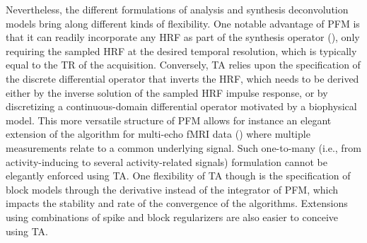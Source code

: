 Nevertheless, the different formulations of analysis and synthesis deconvolution models bring along different kinds of flexibility. One notable advantage of PFM is that it can readily incorporate any HRF as part of the synthesis operator (\citealt{Elad2007Analysisversussynthesis}), only requiring the sampled HRF at the desired temporal resolution, which is typically equal to the TR of the acquisition. Conversely, TA relies upon the specification of the discrete differential operator that inverts the HRF, which needs to be derived either by the inverse solution of the sampled HRF impulse response, or by discretizing a continuous-domain differential operator motivated by a biophysical model. This more versatile structure of PFM allows for instance an elegant extension of the algorithm for multi-echo fMRI data (\citealt{CaballeroGaudes2019deconvolutionalgorithmmulti}) where multiple measurements relate to a common underlying signal. Such one-to-many (i.e., from activity-inducing to several activity-related signals) formulation cannot be elegantly enforced using TA. 
One flexibility of TA though is the specification of block models through the derivative instead of the integrator of PFM, which impacts the stability and rate of the convergence of the algorithms. Extensions using combinations of spike and block regularizers are also easier to conceive using TA. 


